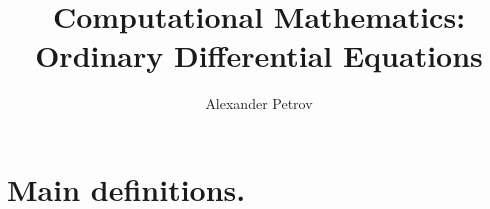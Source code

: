 \documentclass[a4paper,11pt]{article} %
\author{Alexander Petrov}
\title{Computational Mathematics: Ordinary Differential Equations}
\theoremstyle{plain} %
\theoremstyle{definition} %
\theoremstyle{remark} %
\begin{document}
\maketitle

\newpage

\tableofcontents

\newpage

\section{Main definitions.}
\end{document}
